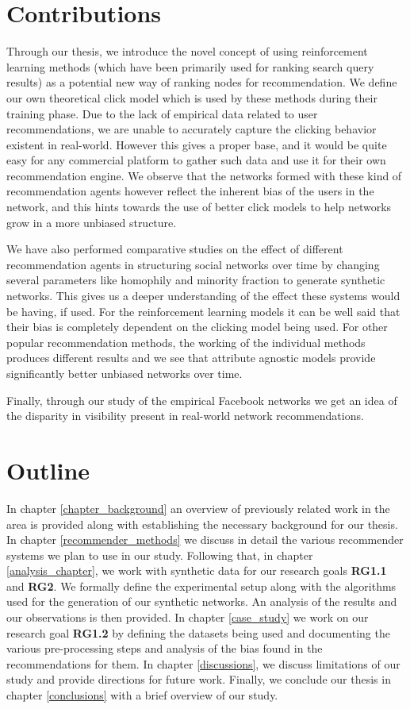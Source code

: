 \section{Contributions}
Through our thesis, we introduce the novel concept of using reinforcement learning methods (which have been primarily used for ranking search query results) as a potential new way of ranking nodes for recommendation. We define our own theoretical click model which is used by these methods during their training phase. Due to the lack of empirical data related to user recommendations, we are unable to accurately capture the clicking behavior existent in real-world. However this gives a proper base, and it would be quite easy for any commercial platform to gather such data and use it for their own recommendation engine. We observe that the networks formed with these kind of recommendation agents however reflect the inherent bias of the users in the network, and this hints towards the use of better click models to help networks grow in a more unbiased structure.

We have also performed comparative studies on the effect of different recommendation agents in structuring social networks over time by changing several parameters like homophily and minority fraction to generate synthetic networks. This gives us a deeper understanding of the effect these systems would be having, if used. For the reinforcement learning models it can be well said that their bias is completely dependent on the clicking model being used. For other popular recommendation methods, the working of the individual methods produces different results and we see that attribute agnostic models provide significantly better unbiased networks over time.

Finally, through our study of the empirical Facebook networks we get an idea of the disparity in visibility present in real-world network recommendations.

\section{Outline}
In chapter \ref{chapter_background} an overview of previously related work in the area is provided along with establishing the necessary background for our thesis. In chapter \ref{recommender_methods} we discuss in detail the various recommender systems we plan to use in our study. Following that, in chapter \ref{analysis_chapter}, we work with synthetic data for our research goals \textbf{RG1.1} and \textbf{RG2}. We formally define the experimental setup along with the algorithms used for the generation of our synthetic networks. An analysis of the results and our observations is then provided. In chapter \ref{case_study} we work on our research goal \textbf{RG1.2} by defining the datasets being used and documenting the various pre-processing steps and analysis of the bias found in the recommendations for them. In chapter \ref{discussions}, we discuss limitations of our study and provide directions for future work. Finally, we conclude our thesis in chapter \ref{conclusions} with a brief overview of our study.